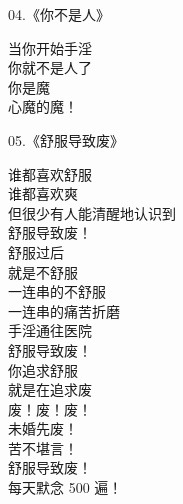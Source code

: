 \begin{multicols}{2}
    \begin{center}
        04.《你不是人》\it

        当你开始手淫 \\ 你就不是人了 \\ 你是魔 \\ 心魔的魔！
    \end{center}

    \begin{center}
        05.《舒服导致废》\it

        谁都喜欢舒服 \\ 谁都喜欢爽 \\ 但很少有人能清醒地认识到 \\ 舒服导致废！ \\ 舒服过后 \\ 就是不舒服 \\ 一连串的不舒服 \\ 一连串的痛苦折磨 \\ 手淫通往医院 \\ 舒服导致废！ \\ 你追求舒服 \\ 就是在追求废 \\ 废！废！废！ \\ 未婚先废！ \\ 苦不堪言！ \\ 舒服导致废！ \\ 每天默念 500 遍！
    \end{center}
\end{multicols}


